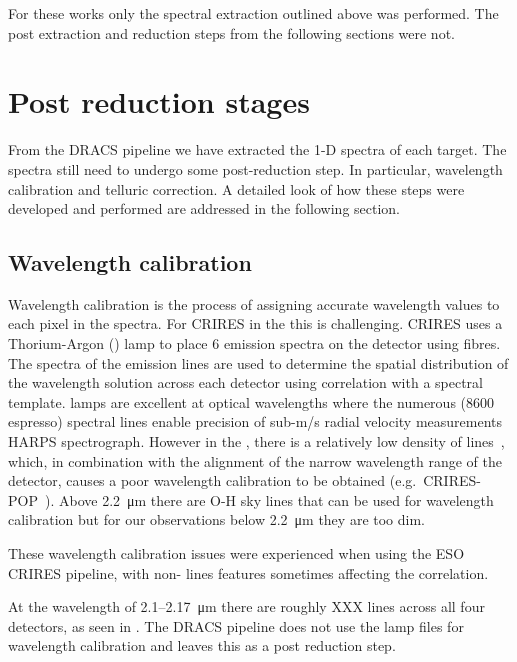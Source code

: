 For these works only the spectral extraction outlined above was performed. The post extraction and reduction steps from the following sections were not.


\section{Post reduction stages}
\label{sec:posreduction}
From the DRACS pipeline we have extracted the 1-D spectra of each target. The spectra still need to undergo some post-reduction step. In particular, wavelength calibration and telluric correction. A detailed look of how these steps were developed and performed are addressed in the following section.

\subsection{Wavelength calibration}
\label{subsec:wavecalib}
Wavelength calibration is the process of assigning accurate wavelength values to each pixel in the spectra. For CRIRES in the \nir{} this is challenging. CRIRES uses a Thorium-Argon (\thar) lamp to place 6 emission spectra on the detector using fibres. The spectra of the \thar{} emission lines are used to determine the spatial distribution of the wavelength solution across each detector using correlation with a spectral template. \thar{} lamps are excellent at optical wavelengths where the numerous (8600 espresso) spectral lines enable precision of sub-m/s radial velocity measurements HARPS spectrograph. However in the \nir{}, there is a relatively low density of \thar{} lines~\citep{kerber_laboratory_2009}, which, in combination with the alignment of the narrow wavelength range of the detector, causes a poor wavelength calibration to be obtained (e.g.\ CRIRES-POP~\citep{nicholls_crirespop_2017}).
Above 2.2~\si{\micro\meter} there are {O-H} sky lines that can be used for wavelength calibration but for our observations below 2.2~\si{\micro\meter} they are too dim.

These wavelength calibration issues were experienced when using the ESO CRIRES pipeline, with non-\thar{} lines features sometimes affecting the correlation.

At the wavelength of 2.1--2.17~\si{\micro\meter} there are roughly XXX \thar{} lines across all four detectors, as seen in .
The DRACS pipeline does not use the \thar{} lamp files for wavelength calibration and leaves this as a post reduction step.

